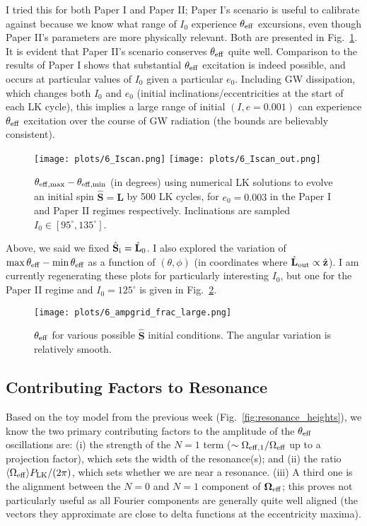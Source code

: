\documentclass[11pt,
        usenames, %
        dvipsnames %
    ]{article}
\newcommand*{\bm}[1]{\boldsymbol{\mathbf{#1}}}
\newcommand*{\uv}[1]{\hat{\bm{#1}}}
\newcommand*{\ev}[1]{\langle#1\rangle}
\begin{document}
I tried this for both Paper I and Paper II\@; Paper I's scenario is useful to
calibrate against because we know what range of $I_0$ experience $\theta_{\rm
eff}$ excursions, even though Paper II's parameters are more physically
relevant. Both are presented in Fig.~\ref{fig:Iscan}. It is evident that Paper
II's scenario conserves $\theta_{\rm eff}$ quite well. Comparison to the results
of Paper I shows that substantial $\theta_{\rm eff}$ excitation is indeed
possible, and occurs at particular values of $I_0$ given a particular $e_0$.
Including GW dissipation, which changes both $I_0$ and $e_0$ (initial
inclinations/eccentricities at the start of each LK cycle), this implies a
large range of initial $(I, e=0.001)$ can experience $\theta_{\rm eff}$
excitation over the course of GW radiation (the bounds are believably
consistent).
\begin{figure}
    \centering
    \texttt{[image: plots/6\_Iscan.png]}
    \texttt{[image: plots/6\_Iscan\_out.png]}
    \caption{$\theta_{\rm eff, \max} - \theta_{\rm eff, \min}$ (in degrees)
    using numerical LK solutions to evolve an initial spin $\uv{S} = \uv{L}$ by
    500 LK cycles, for $e_0 = 0.003$ in the Paper I and Paper II regimes
    respectively. Inclinations are sampled $I_0 \in [95^\circ,
    135^\circ]$.}\label{fig:Iscan}
\end{figure}

Above, we said we fixed $\uv{S}_{\rm i} = \uv{L}_0$. I also explored the
variation of $\max \theta_{\rm eff} - \min \theta_{\rm eff}$ as a function of
$(\theta, \phi)$ (in coordinates where $\uv{L}_{\rm out} \propto \uv{z}$). I am
currently regenerating these plots for particularly interesting $I_0$, but one
for the Paper II regime and $I_0 = 125^\circ$ is given in
Fig.~\ref{fig:ampgrid_frag_large}.
\begin{figure}
    \centering
    \texttt{[image: plots/6\_ampgrid\_frac\_large.png]}
    \caption{$\theta_{\rm eff}$ for various possible $\uv{S}$ initial
    conditions. The angular variation is relatively
    smooth.}\label{fig:ampgrid_frag_large}
\end{figure}

\subsection{Contributing Factors to Resonance}

Based on the toy model from the previous week
(Fig.~\ref{fig:resonance_heights}), we know the two primary contributing factors
to the amplitude of the $\theta_{\rm eff}$ oscillations are: (i) the strength of
the $N = 1$ term ($\sim \Omega_{\rm eff, 1} / \Omega_{\rm eff}$ up to a
projection factor), which sets the width of the resonance(s); and (ii) the ratio
$\ev{\Omega_{\rm eff}} P_{\rm LK} / (2\pi)$, which sets whether we are near a
resonance. (iii) A third one is the alignment between the $N = 0$
and $N = 1$ component of $\bm{\Omega}_{\rm eff}$; this proves not particularly
useful as all Fourier components are generally quite well aligned (the vectors
they approximate are close to delta functions at the eccentricity maxima).
\end{document}
